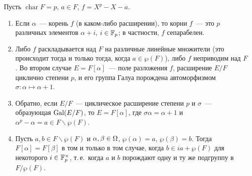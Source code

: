 \begin{theorem}
Пусть $\operatorname{char}F=p$, $a\in F$, $f=X^p-X-a$.
\begin{enumerate}[label=\textup{(\alph*)}]
\item Если $\alpha$~--- корень $f$ (в каком-либо расширении), то корни $f$~--- это $p$ различных элементов $\alpha+i$,
$i\in\mathbb F_p$; в частности, $f$ сепарабелен.
\item Либо $f$ раскладывается над $F$ на различные линейные множители (это происходит тогда и только тогда, когда
$a\in\wp(F)$), либо $f$ неприводим над $F$. Во втором случае $E=F[\alpha]$~--- поле разложения $f$, расширение $E/F$
циклично степени $p$, и его группа Галуа порождена автоморфизмом $\sigma\colon\alpha\mapsto\alpha+1$.
\item Обратно, если $E/F$~--- циклическое расширение степени $p$ и $\sigma$~--- образующая $\operatorname{Gal}(E/F)$, то
$E=F[\alpha]$, где $\sigma\alpha=\alpha+1$ и $\alpha^p-\alpha=a\in F\smallsetminus\wp(F)$.
\item Пусть $a,b\in F\smallsetminus\wp(F)$ и $\alpha,\beta\in\Omega$, $\wp(\alpha)=a$, $\wp(\beta)=b$. Тогда
$F[\alpha]=F[\beta]$ в том и только в том случае, когда $b\in ia+\wp(F)$ для некоторого $i\in\mathbb F_p^\times$, т.\,е.\ когда $a$
и $b$ порождают одну и ту же подгруппу в $F/\wp(F)$.
\end{enumerate}
\end{theorem}

